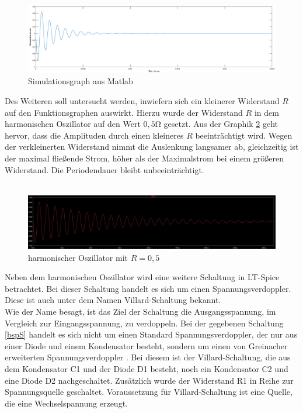 \begin{figure}[h!]
	\includegraphics[width=\textwidth]{data/fctmat}
	\caption{Simulationsgraph aus Matlab}
	\label{mat}
\end{figure}
\newpage
Des Weiteren soll untersucht werden, inwiefern sich ein kleinerer Widerstand $R$ auf den Funktionsgraphen auswirkt. Hierzu wurde der Widerstand $R$ in dem harmonischen Oszillator auf den Wert $0,5$\si{\ohm} gesetzt. Aus der Graphik \ref{14R} geht hervor, dass die Amplituden durch einen kleineres $R$ beeinträchtigt wird. Wegen der verkleinerten Widerstand nimmt die Auslenkung langsamer ab, gleichzeitig ist der maximal fließende Strom,  höher als der Maximalstrom bei einem größeren Widerstand. Die Periodendauer bleibt unbeeinträchtigt.
\\ \\
\begin{figure}[h]
	\includegraphics[width=\textwidth]{data/kleineresR}
	\caption{harmonischer Oszillator mit $R = 0,5$\ohm}
	\label{14R}
\end{figure}

Neben dem harmonischen Oszillator wird eine weitere Schaltung in LT-Spice betrachtet. Bei dieser Schaltung handelt es sich um einen Spannungsverdoppler. Diese ist auch unter dem Namen Villard-Schaltung bekannt.\\

Wie der Name besagt, ist das Ziel der Schaltung die Ausgangsspannung, im Vergleich zur Eingangsspannung, zu verdoppeln. Bei der gegebenen Schaltung \ref{bspS} handelt es sich nicht um einen Standard Spannungsverdoppler, der nur aus einer Diode und einem Kondensator besteht, sondern um einen von Greinacher erweiterten Spannungsverdoppler . Bei diesem ist der Villard-Schaltung, die aus dem Kondensator C1 und der Diode D1 besteht, noch ein Kondensator C2 und eine Diode D2 nachgeschaltet. Zusätzlich wurde der Widerstand R1 in Reihe zur Spannungsquelle geschaltet. Voraussetzung für Villard-Schaltung ist eine Quelle, die eine Wechselspannung erzeugt. \\

